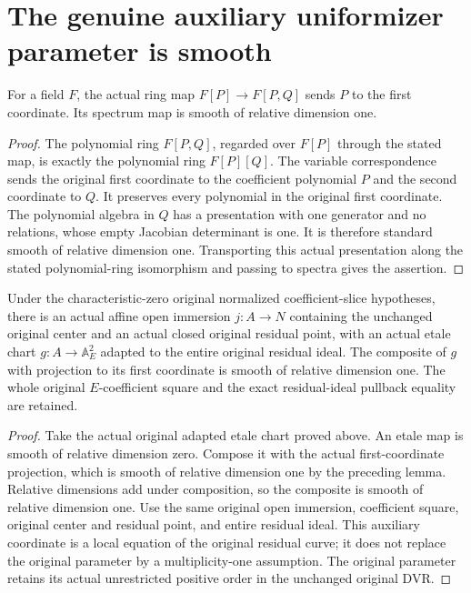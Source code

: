 \section{The genuine auxiliary uniformizer parameter is smooth}
\begin{lemma}\label{lem:plane-first-coordinate-smooth-parameter}
For a field $F$, the actual ring map $F[P]\to F[P,Q]$ sends $P$ to the first coordinate. Its spectrum map is smooth of relative dimension one.
\leanok
\end{lemma}
\begin{proof}
The polynomial ring $F[P,Q]$, regarded over $F[P]$ through the stated map, is exactly the polynomial ring $F[P][Q]$. The variable correspondence sends the original first coordinate to the coefficient polynomial $P$ and the second coordinate to $Q$. It preserves every polynomial in the original first coordinate. The polynomial algebra in $Q$ has a presentation with one generator and no relations, whose empty Jacobian determinant is one. It is therefore standard smooth of relative dimension one. Transporting this actual presentation along the stated polynomial-ring isomorphism and passing to spectra gives the assertion.
\end{proof}

\begin{theorem}\label{thm:normalized-actual-smooth-auxiliary-parameter}
Under the characteristic-zero original normalized coefficient-slice hypotheses, there is an actual affine open immersion $j:A\to N$ containing the unchanged original center and an actual closed original residual point, with an actual etale chart $g:A\to\mathbb A_E^2$ adapted to the entire original residual ideal. The composite of $g$ with projection to its first coordinate is smooth of relative dimension one. The whole original $E$-coefficient square and the exact residual-ideal pullback equality are retained.
\leanok
\end{theorem}
\begin{proof}
Take the actual original adapted etale chart proved above. An etale map is smooth of relative dimension zero. Compose it with the actual first-coordinate projection, which is smooth of relative dimension one by the preceding lemma. Relative dimensions add under composition, so the composite is smooth of relative dimension one. Use the same original open immersion, coefficient square, original center and residual point, and entire residual ideal. This auxiliary coordinate is a local equation of the original residual curve; it does not replace the original parameter by a multiplicity-one assumption. The original parameter retains its actual unrestricted positive order in the unchanged original DVR.
\end{proof}
